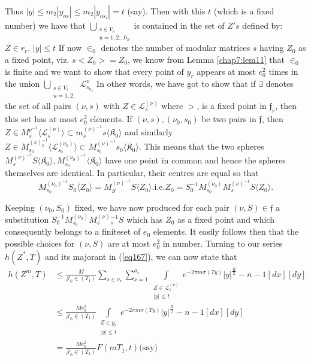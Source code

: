  Thus $|y| \leq m_2 |y_{os}| \leq m_2 |y_{{os}_i} | = t $ (say). Then
 with this $t$ (which is a fixed number) we have that
 $\bigcup\limits_{\substack {s \in V_r \\ u=1,2 \ldots
     0_{S}}}$\pageoriginale  is  contained in the set of $Z ' s$
 defined by:   
 $Z \in r_r$, $|y| \leq t$ If now $\in _0$ denotes the number of modular
 matrices $s$ having $Z_0$ as a fixed point, viz. $s<Z_0> =Z_0$, we
 know from Lemma \ref{chap7:lem11} that  
 $\in _0$ is finite and we want to show that every point of $y_r$
 appears at most $e^2_0$ times in the union $\bigcup\limits_{\substack
   {s \in V_r \\ {u=1,2,}}}  \mathcal{L}^\nu_{s_{a_s}  }$ In other
 words, we have got to show that if $\exists$ denotes the set of all
 pairs $(\nu, s)$ with $Z \in \mathcal{L}^{(\nu)}_s$ where $>$, is a
 fixed point in $\mathfrak{f}_r$, then this set has at most $e^2_0$
 elements. If $(\nu, s), (\nu_0, s_0)$ be two pairs in $\mathfrak{f}$,
 then $Z \in M^{\nu^{-1}}_s \langle\mathcal{L}^{(\nu)}_s\rangle
 \subset m_s^{{(\nu)}^{-1}}s \langle\mathfrak{K}_0\rangle$ and
 similarly  $Z \in M^{(\nu)_0^{-1}}_{s_0
 }\langle\mathcal{L}^{(\nu_0)}_{s_0}\rangle \subset
 M_{s_0}^{{(\nu)}^{-1}}s_0 \langle\mathfrak{K}_0\rangle$. This means
 that the two spheres $M^{(\nu)^{-1}}_s S \langle\mathfrak{K}_0\rangle,
 M^{(\nu_0)^{-1}}_{s_0} \langle\mathfrak{K}_0\rangle $ have one point
 in common and hence the spheres themselves are identical. In
 particular, their centres are equal so that  
 $$
 M^{{(\nu_0)}^{-1}}_{s_0} S_0 \langle Z_0 \rangle = M^{{(\nu)}^{-1}}_S
 S \langle Z_0 \rangle. 
 \text{i.e.}  Z_0 = S^{-1}_0 M^{(\nu_0)}_{s_0} M^{(\nu)^{-1}}_s S
 \langle Z_0 \rangle. 
 $$
 
Keeping $(\nu_0, S_0)$ fixed, we have now produced for each pair $
(\nu, S) \in \mathfrak{f} $ a substitution $ S^{-1} _0 M^{(\nu_0)}
_{s_0} M_{s}^(\nu)^{-1}_s S$ which has $Z_0$ as a fixed point and
which consequently belongs to a finite\pageoriginale  set of $e_0$
elements. It 
easily follows then that the possible choices for $(\nu, S)$ are at
most $e^2_0$ in number. Turning to our series $h(Z^*, T)$ and its
majorant in (\ref{eq167}), we can now state that  
\begin{align*}
h(Z^m,T) & \leq \frac{M}{\mathcal{J}_0 \in (T_1)} \sum_{s \in v_{r}}
\sum^{a_{s}}_{\nu =1} \int \limits_{\substack {Z \in
    \mathcal{L}^{(\nu)}_{s} \\ {|y| \leq t }}} e^{-2 \pi m \sigma
  (Ty)} |y|^{\frac{R}{2}}-n-1 [dx][dy] \\ 
&  \leq \frac{Me^2_0}{\mathcal{J}_0\in (T_1)} \int \limits_{\substack
  {Z \in y_r \\ {|y|\leq t }}} e^{-2\pi m \sigma
  (Ty)}|y|^{\frac{R}{2}}-n-1 [dx][dy] \\ 
& = \frac{Me^2_0}{\mathcal{J}_0\in (T_1)} F (m T_1, t)  \text{(say)} 
\end{align*}

